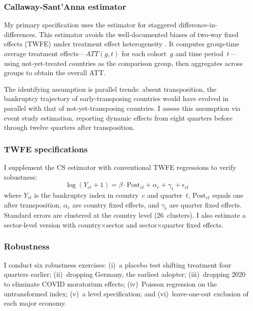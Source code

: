 \documentclass[12pt]{article}
\begin{document}
\subsubsection*{Callaway-Sant'Anna estimator} My primary specification uses the \citet{CallawayandSantAnna2021} estimator for staggered difference-in-differences. This estimator avoids the well-documented biases of two-way fixed effects (TWFE) under treatment effect heterogeneity \citep{GoodmanBacon2021, deChaisemartinDHaultfoeuille2020, SunAbraham2021}. It computes group-time average treatment effects---$ATT(g,t)$ for each cohort~$g$ and time period~$t$---using not-yet-treated countries as the comparison group, then aggregates across groups to obtain the overall ATT.

The identifying assumption is parallel trends: absent transposition, the bankruptcy trajectory of early-transposing countries would have evolved in parallel with that of not-yet-transposing countries. I assess this assumption via event study estimation, reporting dynamic effects from eight quarters before through twelve quarters after transposition.

\subsubsection*{TWFE specifications} I supplement the CS estimator with conventional TWFE regressions to verify robustness:
\begin{equation}
\log(Y_{ct} + 1) = \beta \cdot \text{Post}_{ct} + \alpha_c + \gamma_t + \epsilon_{ct}
\label{eq:twfe}
\end{equation}
where $Y_{ct}$ is the bankruptcy index in country~$c$ and quarter~$t$, $\text{Post}_{ct}$ equals one after transposition, $\alpha_c$ are country fixed effects, and $\gamma_t$ are quarter fixed effects. Standard errors are clustered at the country level (26~clusters). I also estimate a sector-level version with country$\times$sector and sector$\times$quarter fixed effects.

\subsubsection*{Robustness} I conduct six robustness exercises: (i)~a placebo test shifting treatment four quarters earlier; (ii)~dropping Germany, the earliest adopter; (iii)~dropping 2020 to eliminate COVID moratorium effects; (iv)~Poisson regression on the untransformed index; (v)~a level specification; and (vi)~leave-one-out exclusion of each major economy.
\end{document}
